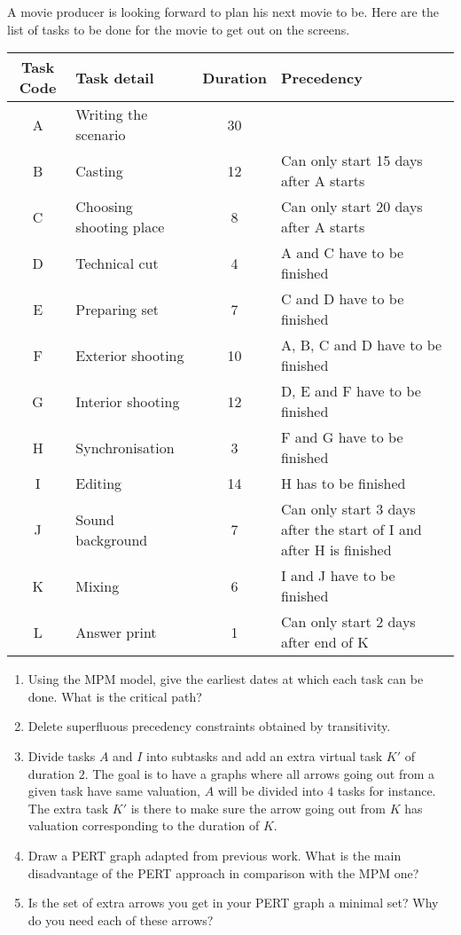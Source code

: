 \documentclass[11pt,a4paper]{article}
\begin{document}
\begin{question}[subtitle= {Assisting the Director}]
  A movie producer is looking forward to plan his next movie to
  be. Here are the list of tasks to be done for the movie to get out
  on the screens. 
  \begin{center}
    \renewcommand{\arraystretch}{1.5}
    \begin{tabular}{|c|l|c|p{5cm}|}
      \hline
      Task Code & Task detail & Duration & Precedency \\
      \hline
      A & Writing the scenario  & 30  &   \\
      \hline
      B & Casting  & 12  & Can only start 15 days after A starts  \\
      \hline
      C & Choosing shooting place  & 8  &  Can only start 20 days after A starts \\
      \hline
      D & Technical cut  & 4  & A and C have to be finished  \\
      \hline
      E & Preparing set  & 7  & C and D have to be finished  \\
      \hline
      F & Exterior shooting  & 10  & A, B, C and D have to be finished  \\
      \hline
      G & Interior shooting  & 12  & D, E and F have to be finished  \\
      \hline
      H & Synchronisation  & 3  & F and G have to be finished  \\
      \hline
      I & Editing  & 14  & H has to be finished  \\
      \hline
      J & Sound background  & 7  & Can only start 3 days after the start of I and after H is finished  \\
      \hline
      K & Mixing  & 6  & I and J have to be finished  \\
      \hline
      L & Answer print  & 1  & Can only start 2 days after end of K  \\
      \hline       
    \end{tabular}
  \end{center}
  \begin{enumerate}
  \item Using the MPM model, give the earliest dates at which each
    task can be done. What is the critical path?
  \item Delete superfluous precedency constraints obtained by transitivity.
  \item Divide tasks $A$ and $I$ into subtasks and add an extra
    virtual task $K'$ of duration $2$. The goal is to have a graphs
    where all arrows going out from a given task have same valuation,
    $A$ will be divided into $4$ tasks for instance. The extra task
    $K'$ is there to make sure the arrow going out from $K$ has
    valuation corresponding to the duration of $K$. 
  \item Draw a PERT graph adapted from previous work. What is the main
    disadvantage of the PERT approach in comparison with the MPM one?
  \item Is the set of extra arrows you get in your PERT graph a
    minimal set? Why do you need each of these arrows?
  \end{enumerate}
\end{question}
\end{document}
